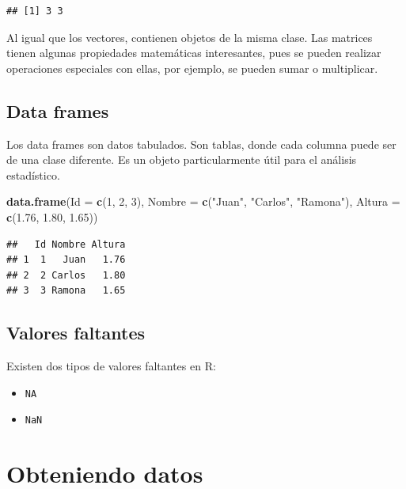 \documentclass[spanish,]{book}
\newenvironment{Shaded}{\begin{snugshade}}{\end{snugshade}}
\newcommand{\KeywordTok}[1]{\textcolor[rgb]{0.13,0.29,0.53}{\textbf{#1}}}
\newcommand{\DataTypeTok}[1]{\textcolor[rgb]{0.13,0.29,0.53}{#1}}
\newcommand{\DecValTok}[1]{\textcolor[rgb]{0.00,0.00,0.81}{#1}}
\newcommand{\FloatTok}[1]{\textcolor[rgb]{0.00,0.00,0.81}{#1}}
\newcommand{\StringTok}[1]{\textcolor[rgb]{0.31,0.60,0.02}{#1}}
\newcommand{\NormalTok}[1]{#1}
\providecommand{\tightlist}{%
  \setlength{\itemsep}{0pt}\setlength{\parskip}{0pt}}
\begin{document}
\begin{verbatim}
## [1] 3 3
\end{verbatim}

Al igual que los vectores, contienen objetos de la misma clase. Las
matrices tienen algunas propiedades matemáticas interesantes, pues se
pueden realizar operaciones especiales con ellas, por ejemplo, se pueden
sumar o multiplicar.

\section{Data frames}\label{data-frames}

Los data frames son datos tabulados. Son tablas, donde cada columna
puede ser de una clase diferente. Es un objeto particularmente útil para
el análisis estadístico.

\begin{Shaded}
\begin{Highlighting}[]
\KeywordTok{data.frame}\NormalTok{(}\DataTypeTok{Id =} \KeywordTok{c}\NormalTok{(}\DecValTok{1}\NormalTok{, }\DecValTok{2}\NormalTok{, }\DecValTok{3}\NormalTok{),}
           \DataTypeTok{Nombre =} \KeywordTok{c}\NormalTok{(}\StringTok{"Juan"}\NormalTok{, }\StringTok{"Carlos"}\NormalTok{, }\StringTok{"Ramona"}\NormalTok{),}
           \DataTypeTok{Altura =} \KeywordTok{c}\NormalTok{(}\FloatTok{1.76}\NormalTok{, }\FloatTok{1.80}\NormalTok{, }\FloatTok{1.65}\NormalTok{))}
\end{Highlighting}
\end{Shaded}

\begin{verbatim}
##   Id Nombre Altura
## 1  1   Juan   1.76
## 2  2 Carlos   1.80
## 3  3 Ramona   1.65
\end{verbatim}

\section{Valores faltantes}\label{valores-faltantes}

Existen dos tipos de valores faltantes en R:

\begin{itemize}
\tightlist
\item
  \texttt{NA}
\item
  \texttt{NaN}
\end{itemize}

\chapter{Obteniendo datos}\label{obteniendo-datos}
\end{document}
